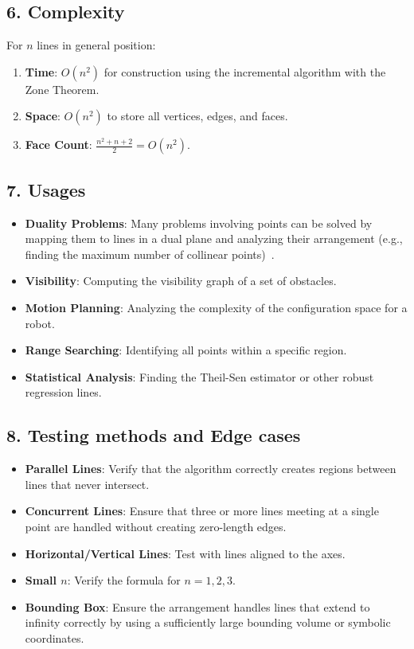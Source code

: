 \subsection{6. Complexity}
\begin{theorem}
\label{thm:la_complexity_summary}
For $n$ lines in general position:
\begin{enumerate}
    \item \textbf{Time}: $O(n^2)$ for construction using the incremental algorithm with the Zone Theorem.
    \item \textbf{Space}: $O(n^2)$ to store all vertices, edges, and faces.
    \item \textbf{Face Count}: $\frac{n^2+n+2}{2} = O(n^2)$.
\end{enumerate}
\end{theorem}

\subsection{7. Usages}
\begin{itemize}
    \item \textbf{Duality Problems}: Many problems involving points can be solved by mapping them to lines in a dual plane and analyzing their arrangement (e.g., finding the maximum number of collinear points)~\cite{chazelle1985power}.
    \item \textbf{Visibility}: Computing the visibility graph of a set of obstacles.
    \item \textbf{Motion Planning}: Analyzing the complexity of the configuration space for a robot.
    \item \textbf{Range Searching}: Identifying all points within a specific region.
    \item \textbf{Statistical Analysis}: Finding the Theil-Sen estimator or other robust regression lines.
\end{itemize}

\subsection{8. Testing methods and Edge cases}
\begin{itemize}
    \item \textbf{Parallel Lines}: Verify that the algorithm correctly creates regions between lines that never intersect.
    \item \textbf{Concurrent Lines}: Ensure that three or more lines meeting at a single point are handled without creating zero-length edges.
    \item \textbf{Horizontal/Vertical Lines}: Test with lines aligned to the axes.
    \item \textbf{Small $n$}: Verify the formula for $n=1, 2, 3$.
    \item \textbf{Bounding Box}: Ensure the arrangement handles lines that extend to infinity correctly by using a sufficiently large bounding volume or symbolic coordinates.
\end{itemize}

